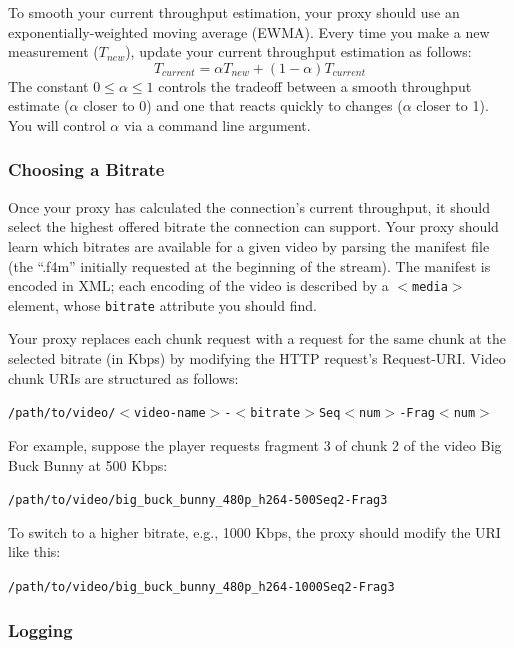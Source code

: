 \documentclass{article}
\begin{document}
To smooth your current throughput estimation, your proxy should use an
exponentially-weighted moving average (EWMA). Every time you make a new
measurement ($T_{new}$), update your current throughput estimation as follows:
\begin{equation}
	T_{current} = \alpha T_{new}  +  (1 - \alpha)T_{current}
\label{eq:ewma}
\end{equation}
The constant $0 \leq \alpha \leq 1$ controls the tradeoff between a smooth
throughput estimate ($\alpha$ closer to 0) and one that reacts quickly to
changes ($\alpha$ closer to 1). You will control $\alpha$ via a command line
argument.



\subsubsection{Choosing a Bitrate}

Once your proxy has calculated the connection's current throughput, it should
select the highest offered bitrate the connection can support. Your proxy
should learn which bitrates are available for a given video by parsing the
manifest file (the ``.f4m'' initially requested at the beginning of the
stream). The manifest is encoded in XML; each encoding of the video is
described by a \texttt{$<$media$>$} element, whose \texttt{bitrate} attribute
you should find.

Your proxy replaces each chunk request with a request for the same chunk at the
selected bitrate (in Kbps) by modifying the HTTP request's Request-URI. Video
chunk URIs are structured as follows:
\begin{center}
	\texttt{/path/to/video/$<$video-name$>$-$<$bitrate$>$Seq$<$num$>$-Frag$<$num$>$}
\end{center}

For example, suppose the player requests fragment 3 of chunk 2 of the video Big
Buck Bunny at 500 Kbps:
\begin{center}
	\texttt{/path/to/video/big\_buck\_bunny\_480p\_h264-500Seq2-Frag3}
\end{center}
To switch to a higher bitrate, e.g., 1000 Kbps, the proxy should modify the URI
like this:
\begin{center}
	\texttt{/path/to/video/big\_buck\_bunny\_480p\_h264-1000Seq2-Frag3}
\end{center}


\subsubsection{Logging}
\label{sec:proxy-logging}
\end{document}
